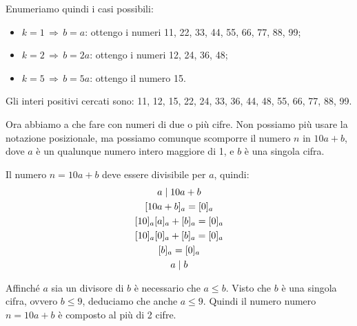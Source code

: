 \begin{soluzione}
    Enumeriamo quindi i casi possibili:
    \begin{itemize}
        \item $k = 1 \,\Longrightarrow\, b = a$: ottengo i numeri 11, 22, 33, 44, 55, 66, 77, 88, 99;
        \item $k = 2 \,\Longrightarrow\, b = 2a$: ottengo i numeri 12, 24, 36, 48;
        \item $k = 5 \,\Longrightarrow\, b = 5a$: ottengo il numero 15.
    \end{itemize}

    \bigskip
    Gli interi positivi cercati sono: 11, 12, 15, 22, 24, 33, 36, 44, 48, 55, 66, 77, 88, 99.

    \bigskip
    Ora abbiamo a che fare con numeri di due o più cifre.
    Non possiamo più usare la notazione posizionale, ma possiamo comunque scomporre il numero $n$ in $10a + b$,
    dove $a$ è un qualunque numero intero maggiore di 1, e $b$ è una singola cifra.

    Il numero $n = 10a + b$ deve essere divisibile per $a$, quindi:
    \begin{gather*}
        a  \mid  10a + b \\
        [10a + b]_a = [0]_a \\
        [10]_a[a]_a + [b]_a = [0]_a \\
        [10]_a[0]_a + [b]_a = [0]_a \\
        [b]_a = [0]_a \\
        a  \mid  b
    \end{gather*}

    Affinché $a$ sia un divisore di $b$ è necessario che $a \le b$.
    Visto che $b$ è una singola cifra, ovvero $b \le 9$, deduciamo che anche $a \le 9$.
    Quindi il numero numero $n = 10a + b$ è composto al più di 2 cifre.
\end{soluzione}

